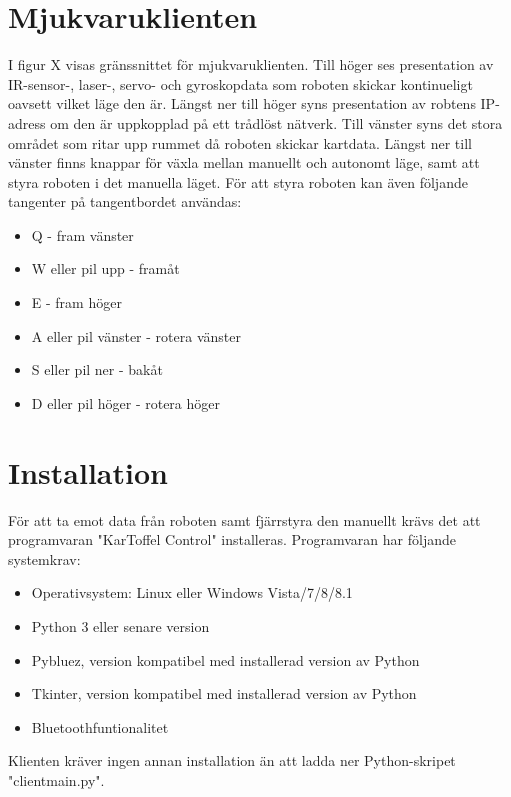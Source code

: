 \documentclass{article}
\begin{document}
\section{Mjukvaruklienten}
I figur X visas gränssnittet för mjukvaruklienten. Till höger ses presentation av IR-sensor-, laser-, servo- och gyroskopdata som roboten skickar kontinueligt oavsett vilket läge den är. Längst ner till höger syns presentation av robtens IP-adress om den är uppkopplad på ett trådlöst nätverk. 
Till vänster syns det stora området som ritar upp rummet då roboten skickar kartdata. Längst ner till vänster finns knappar för växla mellan manuellt och autonomt läge, samt att styra roboten i det manuella läget. För att styra roboten kan även följande tangenter på tangentbordet användas:
\begin{itemize}
    \item Q - fram vänster
    \item W eller pil upp - framåt
    \item E - fram höger
    \item A eller pil vänster - rotera vänster
    \item S eller pil ner - bakåt
    \item D eller pil höger - rotera höger
\end{itemize}

\section{Installation}
För att ta emot data från roboten samt fjärrstyra den manuellt krävs det att programvaran "KarToffel Control" installeras. Programvaran har följande systemkrav:
\begin{itemize}
    \item Operativsystem: Linux eller Windows Vista/7/8/8.1
    \item Python 3 eller senare version
    \item Pybluez, version kompatibel med installerad version av Python
    \item Tkinter, version kompatibel med installerad version av Python
    \item Bluetoothfuntionalitet
\end{itemize}

Klienten kräver ingen annan installation än att ladda ner Python-skripet "client\textunderscore main.py".
\end{document}
